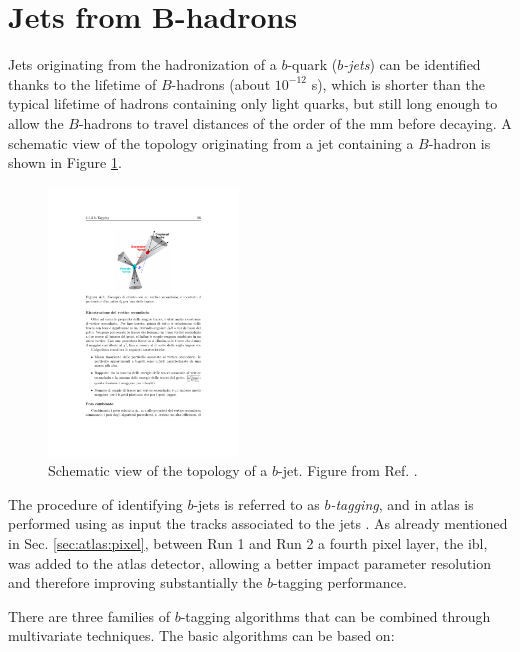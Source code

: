\section{Jets from B-hadrons}
\label{sec:btagging}

Jets originating from the hadronization of a $b$-quark (\textit{$b$-jets}) can be identified thanks to the lifetime of $B$-hadrons (about $10^{-12}$ s), which is shorter than the typical lifetime of hadrons containing only light quarks, but still long enough to allow the $B$-hadrons to travel distances of the order of the mm before decaying. A schematic view of the topology originating from a jet containing a $B$-hadron is shown in Figure \ref{fig:btag}. 
\begin{figure}[h]
\begin{center}
\includegraphics[width=0.45\textwidth]{./figures/objects/secvtx.pdf}
\end{center}
\caption[Schematic view of the topology of a $b$-jet.]{Schematic view of the topology of a $b$-jet. Figure from Ref. \cite{d0btagging}.}
\label{fig:btag}
\end{figure}
The procedure of identifying $b$-jets is referred to as \textit{$b$-tagging}, and in \gls{atlas} is performed using as input the tracks associated to the jets . As already mentioned in Sec. \ref{sec:atlas:pixel}, between Run 1 and Run 2 a fourth pixel layer, the \gls{ibl}, was added to the \gls{atlas} detector, allowing a better impact parameter resolution and therefore improving substantially the $b$-tagging performance. 

There are three families of $b$-tagging algorithms that can be combined through multivariate techniques. The basic algorithms can be based on:

